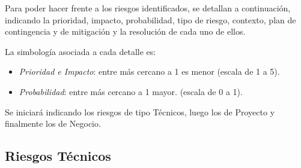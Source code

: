 Para poder hacer frente a los riesgos identificados, se detallan a continuaci\'on, indicando la prioridad, impacto, probabilidad, tipo de riesgo, contexto, plan de contingencia y de mitigaci\'on y la resoluci\'on de cada uno de ellos.

La simbolog\'ia asociada a cada detalle es:

\begin{itemize}
\item \emph{Prioridad e Impacto}: entre m\'as cercano a 1 es menor (escala de  1 a  5). 
\item \emph{Probabilidad}: entre m\'as cercano a 1 mayor. (escala de 0 a 1).
\end{itemize}

Se iniciar\'a indicando los riesgos de tipo T\'ecnicos, luego los de Proyecto y finalmente los de Negocio.

\newpage
\subsection{Riesgos T\'ecnicos}

